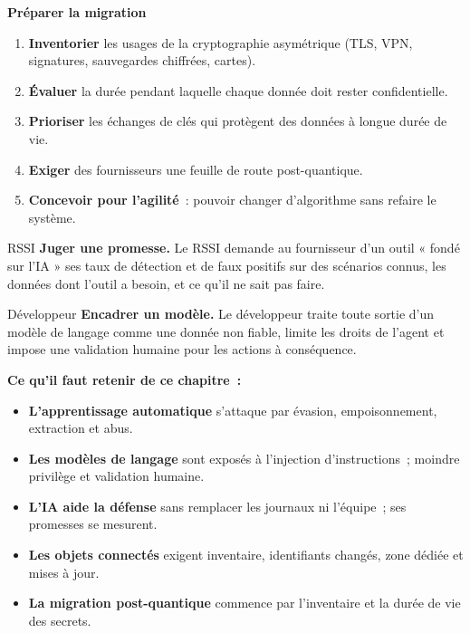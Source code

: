 \begin{boxprocedure}
\textbf{Préparer la migration}
\begin{enumerate}
    \item \textbf{Inventorier} les usages de la cryptographie asymétrique
          (TLS, VPN, signatures, sauvegardes chiffrées, cartes).
    \item \textbf{Évaluer} la durée pendant laquelle chaque donnée doit
          rester confidentielle.
    \item \textbf{Prioriser} les échanges de clés qui protègent des données
          à longue durée de vie.
    \item \textbf{Exiger} des fournisseurs une feuille de route
          post-quantique.
    \item \textbf{Concevoir pour l'agilité}~: pouvoir changer d'algorithme
          sans refaire le système.
\end{enumerate}
\end{boxprocedure}

\begin{boxmetier}{RSSI}
\textbf{Juger une promesse.} Le RSSI demande au fournisseur d'un outil
« fondé sur l'IA » ses taux de détection et de faux positifs sur des
scénarios connus, les données dont l'outil a besoin, et ce qu'il ne sait
pas faire.
\end{boxmetier}

\begin{boxmetier}{Développeur}
\textbf{Encadrer un modèle.} Le développeur traite toute sortie d'un
modèle de langage comme une donnée non fiable, limite les droits de
l'agent et impose une validation humaine pour les actions à conséquence.
\end{boxmetier}

\separateur

\begin{boxresume}
\textbf{Ce qu'il faut retenir de ce chapitre~:}
\begin{itemize}
    \item \textbf{L'apprentissage automatique} s'attaque par évasion,
          empoisonnement, extraction et abus.
    \item \textbf{Les modèles de langage} sont exposés à l'injection
          d'instructions~; moindre privilège et validation humaine.
    \item \textbf{L'IA aide la défense} sans remplacer les journaux ni
          l'équipe~; ses promesses se mesurent.
    \item \textbf{Les objets connectés} exigent inventaire, identifiants
          changés, zone dédiée et mises à jour.
    \item \textbf{La migration post-quantique} commence par l'inventaire et
          la durée de vie des secrets.
\end{itemize}
\end{boxresume}

